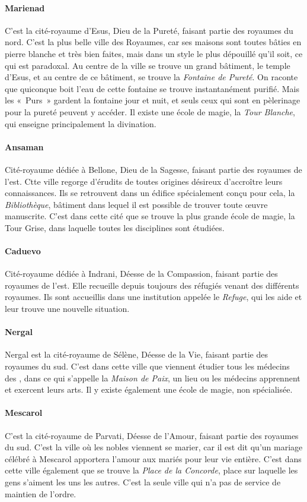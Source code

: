 \documentclass[a4paper,10pt,openany]{book}
\begin{document}
\begin{multicols}{2}
\paragraph{Marienad}
C’est la cité-royaume d’Esus, Dieu de la Pureté, faisant partie des royaumes du nord. C’est la plus belle ville des Royaumes, car ses maisons sont
toutes bâties en pierre blanche et très bien faites, mais dans un style le plus dépouillé qu’il soit, ce qui est paradoxal. Au centre de la ville se
trouve un grand bâtiment, le temple d’Esus, et au centre de ce bâtiment, se trouve la \emph{Fontaine de Pureté}. On raconte que quiconque boit l’eau
de cette fontaine se trouve instantanément purifié. Mais les « Purs » gardent la fontaine jour et nuit, et seuls ceux qui sont en pèlerinage pour la
pureté peuvent y accéder. Il existe une école de magie, la \emph{Tour Blanche}, qui enseigne principalement la divination. 
\paragraph{Ansaman}
Cité-royaume dédiée à Bellone, Dieu de la Sagesse, faisant partie des royaumes de l’est. Ctte ville regorge d’érudits de toutes origines désireux
d’accroître leurs connaissances. Ils se retrouvent dans un édifice spécialement conçu pour cela, la \emph{Bibliothèque}, bâtiment dans lequel il est
possible de trouver toute œuvre manuscrite. C’est dans cette cité que se trouve la plus grande école de magie, la Tour Grise, dans laquelle toutes les
disciplines sont étudiées.
\paragraph{Caduevo}
Cité-royaume dédiée à Indrani, Déesse de la Compassion, faisant partie des royaumes de l’est. Elle recueille depuis toujours des réfugiés venant des
différents royaumes. Ils sont accueillis dans une institution appelée le \emph{Refuge}, qui les aide et leur trouve une nouvelle situation.
\paragraph{Nergal}
Nergal est la cité-royaume de Sélène, Déesse de la Vie, faisant partie des royaumes du sud. C’est dans cette ville que viennent étudier tous les
médecins des \Royaumes, dans ce qui s’appelle la \emph{Maison de Paix}, un lieu ou les médecins apprennent et exercent leurs arts. Il y existe
également une école de magie, non spécialisée. 
\paragraph{Mescarol}
C’est la cité-royaume de Parvati, Déesse de l’Amour, faisant partie des royaumes du sud. C’est la ville où les nobles viennent se marier, car il est
dit qu’un mariage célébré à Mescarol apportera l’amour aux mariés pour leur vie entière. C’est dans cette ville également que se trouve la \emph{Place
de la Concorde}, place sur laquelle les gens s’aiment les uns les autres. C’est la seule ville qui n’a pas de service de maintien de l’ordre.

\end{multicols}
\end{document}
